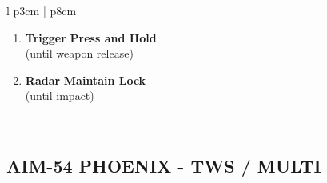 \documentclass[8pt,usenames,dvipsnames,twoside]{article}
\begin{document}
\begin{center}
\begin{tabular}{l p{3cm} | p{8cm}}
\begin{minipage}[t]{\linewidth}
\begin{enumerate}[label=(\alph*)]
\begin{itemize}
						\end{itemize}
						\item \textbf{Trigger} \dotfill \textbf{Press and Hold} \\
						\hfill (until weapon release)
						\item \textbf{Radar} \dotfill \textbf{Maintain Lock} \\
						\hfill (until impact)
					\end{enumerate}
				\end{minipage} \\
				\bottomrule
			\end{tabular}
		\end{center}
	
		\subsection{AIM-54 PHOENIX - TWS / MULTI}
\end{document}
